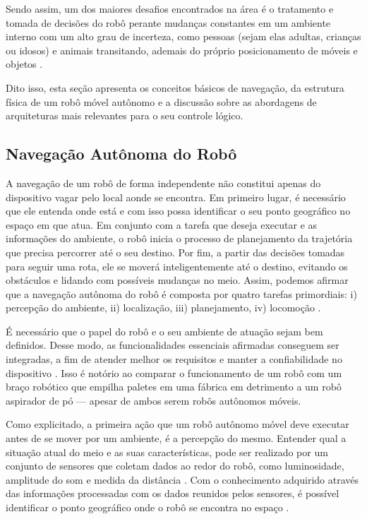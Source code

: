 Sendo assim, um dos maiores desafios encontrados na área é o tratamento e tomada de decisões do robô perante mudanças constantes em um ambiente interno com um alto grau de incerteza, como pessoas (sejam elas adultas, crianças ou idosos) e animais transitando, ademais do próprio  posicionamento de móveis e objetos \cite{practicalIndroductionNehmzow:2012}. 
 
Dito isso, esta seção apresenta os conceitos básicos de navegação, da estrutura física de um robô móvel autônomo e a discussão sobre as abordagens de arquiteturas mais relevantes para o seu controle lógico.


\subsection{Navegação Autônoma do Robô } %

A navegação de um robô de forma independente não constitui apenas do dispositivo vagar pelo local aonde se encontra. Em primeiro lugar, é necessário que ele entenda onde está e com isso possa identificar o seu ponto geográfico no espaço em que atua. Em conjunto com a tarefa que deseja executar e as informações do ambiente, o robô inicia o processo de planejamento da trajetória que precisa percorrer até o seu destino. Por fim, a partir das decisões tomadas para seguir uma rota, ele se moverá inteligentemente até o destino, evitando os obstáculos e lidando com possíveis mudanças no meio. Assim, podemos afirmar que a navegação autônoma do robô é composta por quatro tarefas primordiais: i) percepção do ambiente, ii) localização, iii) planejamento, iv) locomoção \cite{mobileRobotsSiegwart:2011}. 

É necessário que o papel do robô e o seu ambiente de atuação sejam bem definidos. Desse modo, as funcionalidades essenciais afirmadas conseguem ser integradas, a fim de atender melhor os requisitos e manter a confiabilidade no dispositivo \cite{mobileRobotsSiegwart:2011}. 
Isso é notório ao comparar o funcionamento de um robô com um braço robótico que empilha paletes em uma fábrica em detrimento a um robô aspirador de pó — apesar de ambos serem robôs autônomos móveis.

Como explicitado, a primeira ação que um robô autônomo móvel deve executar antes de se mover por um ambiente, é a percepção do mesmo. Entender qual a situação atual do meio e as suas características, pode ser realizado por um conjunto de sensores que coletam dados ao redor do robô, como luminosidade, amplitude do som e medida da distância \cite{mobileRobotsSiegwart:2011}. 
Com o conhecimento adquirido através das informações processadas com os dados reunidos pelos sensores, é possível identificar o ponto geográfico onde o robô se encontra no espaço \cite{mobileRobotsSiegwart:2011}.

